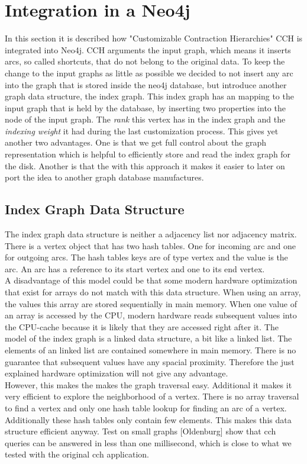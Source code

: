 \chapter{Integration in a Neo4j}

In this section it is described how "Customizable Contraction Hierarchies" CCH is integrated into Neo4j. CCH arguments the input graph, which means it inserts arcs, so called shortcuts, that do not belong to the original data. To keep the change to the input graphs as little as possible we decided to not insert any arc into the graph that is stored inside the neo4j database, but introduce another graph data structure, the index graph. This index graph has an mapping to the input graph that is held by the database, by inserting two properties into the node of the input graph. The \textit{rank} this vertex has in the index graph and the \textit{indexing weight} it had during the last customization process. This gives yet another two advantages. One is that we get full control about the graph representation which is helpful to efficiently store and read the index graph for the disk. Another is that the with this approach it makes it easier to later on port the idea to another graph database manufactures.

\section{Index Graph Data Structure}

The index graph data structure is neither a adjacency list nor adjacency matrix. There is a vertex object that has two hash tables. One for incoming arc and one for outgoing arcs. The hash tables keys are of type vertex and the value is the arc. An arc has a reference to its start vertex and one to its end vertex. \\
A disadvantage of this model could be that some modern hardware optimization that exist for arrays do not match with this data structure. When using an array, the values this array are stored sequentially in main memory. When one value of an array is accessed by the CPU, modern hardware reads subsequent values into the CPU-cache because it is likely that they are accessed right after it. The model of the index graph is a linked data structure, a bit like a linked list. The elements of an linked list are contained somewhere in main memory. There is no guarantee that subsequent values have any spacial proximity. Therefore the just explained hardware optimization will not give any advantage. \\ %
However, this makes the makes the graph traversal easy. Additional it makes it very efficient to explore the neighborhood of a vertex. There is no array traversal to find a vertex and only one hash table lookup for finding an arc of a vertex. Additionally these hash tables only contain few elements. This makes this data structure efficient anyway. Test on small graphs [Oldenburg] show that cch queries can be answered in less than one millisecond, which is close to what we tested with the original cch application.

